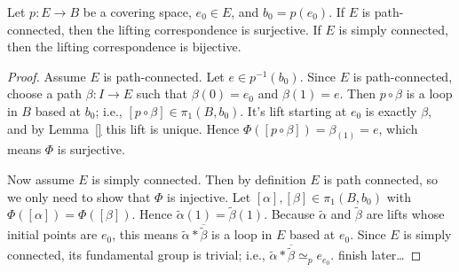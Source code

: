 \begin{proposition}
	Let $p:E \rightarrow B$ be a covering space, $e_0 \in E$, and $b_0 = p(e_0)$. If $E$ is path-connected, then the lifting correspondence is surjective. If $E$ is simply connected, then the lifting correspondence is bijective.
\end{proposition}
	\begin{proof}
		Assume $E$ is path-connected. Let $e \in p^{-1}(b_0)$. Since $E$ is path-connected, choose a path $\beta:I \rightarrow E$ such that $\beta(0) = e_0$ and $\beta(1) = e$. Then $p \circ \beta$ is a loop in $B$ based at $b_0$; i.e., $[p \circ \beta] \in \pi_1(B,b_0)$. It's lift starting at $e_0$ is exactly $\beta$, and by Lemma~\ref{} this lift is unique. Hence $\Phi([p \circ \beta]) = \beta_(1) = e$, which means $\Phi$ is surjective.

		Now assume $E$ is simply connected. Then by definition $E$ is path connected, so we only need to show that $\Phi$ is injective. Let $[\alpha],[\beta] \in \pi_1(B,b_0)$ with $\Phi([\alpha]) = \Phi([\beta])$. Hence $\tilde{\alpha}(1) = \tilde{\beta}(1)$. Because $\tilde{\alpha}$ and $\tilde{\beta}$ are lifts whose initial points are $e_0$, this means $\tilde{\alpha} \ast \overline{\tilde{\beta}}$ is a loop in $E$ based at $e_0$. Since $E$ is simply connected, its fundamental group is trivial; i.e., $\tilde{\alpha} \ast \overline{\tilde{\beta}} \simeq_p e_{e_0}$. {\color{red}finish later\ldots}
	\end{proof}

